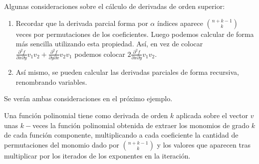 \begin{rmrk}
	Algunas consideraciones sobre el cálculo de derivadas de orden superior:
	
	\begin{enumerate}
		\item Recordar que la derivada parcial forma por $\alpha$ índices aparece $\binom{n+k-1}{k}$ veces por permutaciones de los coeficientes. Luego podemos calcular de forma más sencilla utilizando esta propiedad. Así, en vez de colocar $\frac{\partial^2f}{\partial x \partial y} v_1v_2+ \frac{\partial^2f}{\partial y \partial x}v_2v_1$ podemos colocar $2\frac{\partial^2f}{\partial x \partial y} v_1v_2$.
		
		\item Así mismo, se pueden calcular las derivadas parciales de forma recursiva, renombrando variables. 
	\end{enumerate}
	
	Se verán ambas consideraciones en el próximo ejemplo.
\end{rmrk}

\begin{cor}
	Una función polinomial tiene como derivada de orden $k$ aplicada sobre el vector $v$ unas $k-$veces la función polinomial obtenida de extraer los monomios de grado $k$ de cada función componente, multiplicando a cada coeficiente la cantidad de permutaciones del monomio dado por $\binom{n+k-1}{k}$ y los valores que aparecen tras multiplicar por los iterados de los exponentes en la iteración.
\end{cor}

